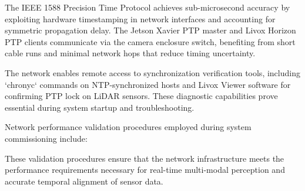 \documentclass{erauthesis}
\begin{document}
The IEEE 1588 Precision Time Protocol achieves sub-microsecond accuracy by exploiting hardware timestamping in network interfaces and accounting for symmetric propagation delay. The Jetson Xavier PTP master and Livox Horizon PTP clients communicate via the camera enclosure switch, benefiting from short cable runs and minimal network hops that reduce timing uncertainty.

The network enables remote access to synchronization verification tools, including `chronyc` commands on NTP-synchronized hosts and Livox Viewer software for confirming PTP lock on LiDAR sensors. These diagnostic capabilities prove essential during system startup and troubleshooting.


Network performance validation procedures employed during system commissioning include:


These validation procedures ensure that the network infrastructure meets the performance requirements necessary for real-time multi-modal perception and accurate temporal alignment of sensor data.




\end{document}
